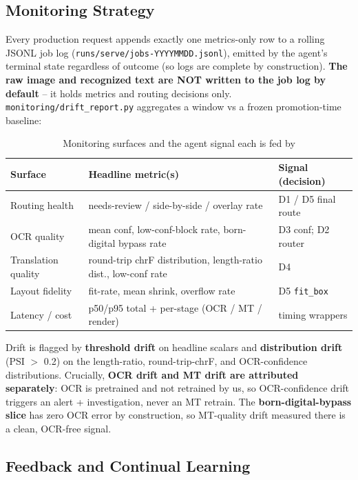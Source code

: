 \documentclass[12pt,a4paper]{article}
\begin{document}
\subsection{Monitoring Strategy}

Every production request appends exactly one metrics-only row to a rolling JSONL job log (\texttt{runs/serve/jobs-YYYYMMDD.jsonl}), emitted by the agent's terminal state regardless of outcome (so logs are complete by construction). \textbf{The raw image and recognized text are NOT written to the job log by default} -- it holds metrics and routing decisions only. \texttt{monitoring/drift\_report.py} aggregates a window vs a frozen promotion-time baseline:

\begin{table}[H]
\centering
\caption{Monitoring surfaces and the agent signal each is fed by}
\small
\begin{tabularx}{\linewidth}{@{} l L l @{}}
\toprule
\textbf{Surface} & \textbf{Headline metric(s)} & \textbf{Signal (decision)} \\
\midrule
Routing health & needs-review / side-by-side / overlay rate & D1 / D5 final route \\
OCR quality & mean conf, low-conf-block rate, born-digital bypass rate & D3 conf; D2 router \\
Translation quality & round-trip chrF distribution, length-ratio dist., low-conf rate & D4 \\
Layout fidelity & fit-rate, mean shrink, overflow rate & D5 \texttt{fit\_box} \\
Latency / cost & p50/p95 total + per-stage (OCR / MT / render) & timing wrappers \\
\bottomrule
\end{tabularx}
\end{table}

Drift is flagged by \textbf{threshold drift} on headline scalars and \textbf{distribution drift} (PSI $>$ 0.2) on the length-ratio, round-trip-chrF, and OCR-confidence distributions. Crucially, \textbf{OCR drift and MT drift are attributed separately}: OCR is pretrained and not retrained by us, so OCR-confidence drift triggers an alert + investigation, never an MT retrain. The \textbf{born-digital-bypass slice} has zero OCR error by construction, so MT-quality drift measured there is a clean, OCR-free signal.

\subsection{Feedback and Continual Learning}
\end{document}

